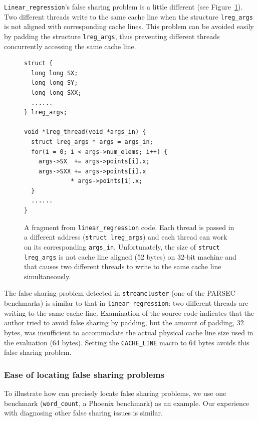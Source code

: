 \texttt{Linear\_regression}'s false sharing problem is a little different (see Figure~\ref{fig:linear_regression}). 
Two different threads write to the same cache line when the structure \texttt{lreg\_args} is not aligned with corresponding cache lines. This problem can be avoided easily by padding the structure \texttt{lreg\_args}, thus preventing different threads concurrently accessing the same cache line. 

\begin{figure}[!t]
\begin{lstlisting}[style=tt]
struct {
  long long SX;
  long long SY;
  long long SXX;
  ......
} lreg_args;

void *lreg_thread(void *args_in) {
  struct lreg_args * args = args_in;
  for(i = 0; i < args->num_elems; i++) {
    args->SX  += args->points[i].x;
    args->SXX += args->points[i].x 
   	         * args->points[i].x;
  }
  ......	
}
\end{lstlisting}
\caption{A fragment from \texttt{linear\_regression} code. Each thread is passed in a different address (\texttt{struct lreg\_args}) and each thread can work on its corresponding \texttt{args\_in}. 
Unfortunately, the size of \texttt{struct lreg\_args} is not cache line aligned (52 bytes) on 32-bit machine and that causes two different threads to write to the same cache line simultaneously. 
\label{fig:linear_regression}}
\end{figure}

The false sharing problem detected in \texttt{streamcluster} (one of the PARSEC benchmarks) is similar to that in \texttt{linear\_regression}: two different threads are writing to the same cache line. Examination of the source code indicates that the author tried to avoid false sharing by padding, but the amount of padding, 32 bytes, was insufficient to accommodate the actual physical cache line size used in the evaluation (64 bytes). Setting the \texttt{CACHE\_LINE} macro to 64 bytes avoids this false sharing problem.


\subsubsection{Ease of locating false sharing problems}

\label{sec:fsfixexample}

To illustrate how \sheriffdetect{} can precisely locate false sharing problems, we use one benchmark (\texttt{word\_count}, a Phoenix benchmark) as an example. Our experience with diagnosing other false sharing issues is similar.

